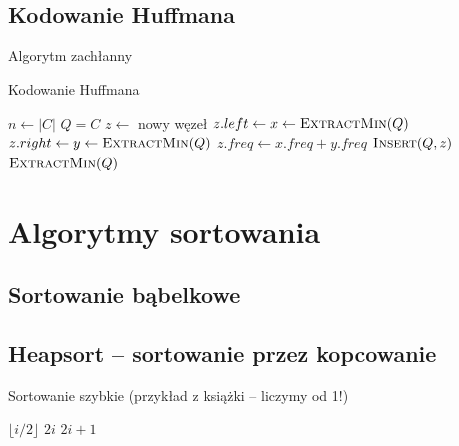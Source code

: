 \documentclass[10pt, oneside]{article}
\theoremstyle{remark}
\begin{document}
\begin{verbatim}
	
\end{verbatim}

\begin{verbatim}
	
\end{verbatim}

\subsection{Kodowanie Huffmana}
Algorytm zachłanny

\begin{algorithm}
    \caption{Kodowanie Huffmana}
    \label{alg:huffman}
    \begin{algorithmic}[1] %
        		\State $n \gets |C|$
        		\State $Q = C$
            		\State $z \gets$ nowy węzeł
            		\State $z.left \gets x \gets \Call{ExtractMin}{Q}$
            		\State $z.right \gets y \gets \Call{ExtractMin}{Q}$
            		\State $z.freq \gets x.freq + y.freq$
            		\State $\Call{Insert}{Q, z}$
            	\EndFor
            	\Return $\Call{ExtractMin}{Q}$
        \EndFunction
    \end{algorithmic}
\end{algorithm}

\section{Algorytmy sortowania}

\subsection{Sortowanie bąbelkowe}

\subsection{Heapsort -- sortowanie przez kopcowanie}

\begin{algorithm}
    \caption{Sortowanie szybkie (przykład z książki -- liczymy od 1!)}
    \label{alg:quicksort}
    \begin{algorithmic}[1] %
            \State \Return $\lfloor i/2 \rfloor$
        \EndFunction
            	\State \Return $2i$
        \EndFunction
            	\State \Return $2i+1$
        \EndFunction
    \end{algorithmic}
\end{algorithm}
\end{document}
